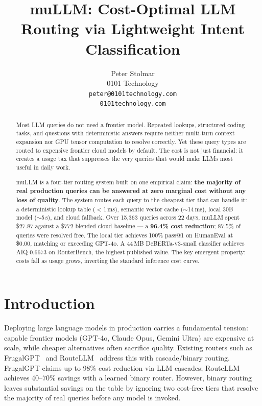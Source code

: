 \documentclass[11pt]{article}
\title{muLLM: Cost-Optimal LLM Routing via Lightweight Intent Classification}
\author{Peter Stolmar \\
  0101 Technology \\
  \texttt{peter@0101technology.com} \\
  \texttt{0101technology.com}}
\begin{document}
\maketitle

\begin{abstract}
Most LLM queries do not need a frontier model. Repeated lookups,
structured coding tasks, and questions with deterministic answers require
neither multi-turn context expansion nor GPU tensor computation to
resolve correctly. Yet these query types are routed to expensive frontier
cloud models by default. The cost is not just financial: it creates a
usage tax that suppresses the very queries that would make LLMs most
useful in daily work.

muLLM is a four-tier routing system built on one empirical claim:
\textbf{the majority of real production queries can be answered at zero
marginal cost without any loss of quality}. The system routes each query
to the cheapest tier that can handle it: a deterministic lookup table
($<$1\,ms), semantic vector cache ($\sim$14\,ms), local 30B model
($\sim$5\,s), and cloud fallback. Over 15,363 queries across 22 days,
muLLM spent \$27.87 against a \$772 blended cloud baseline --- a
\textbf{96.4\% cost reduction}; 87.5\% of queries were resolved free.
The local tier achieves 100\% pass@1 on HumanEval at \$0.00, matching
or exceeding GPT-4o. A 44\,MB DeBERTa-v3-small classifier achieves AIQ
0.6673 on RouterBench, the highest published value. The key emergent
property: costs fall as usage grows, inverting the standard inference
cost curve.
\end{abstract}

\section{Introduction}

Deploying large language models in production carries a fundamental
tension: capable frontier models (GPT-4o, Claude Opus, Gemini Ultra) are
expensive at scale, while cheaper alternatives often sacrifice quality.
Existing routers such as FrugalGPT~\cite{chen2023frugalgpt} and
RouteLLM~\cite{ong2024routellm} address this with cascade/binary
routing. FrugalGPT claims up to 98\% cost reduction via LLM cascades;
RouteLLM achieves 40--70\% savings with a learned binary router. However,
binary routing leaves substantial savings on the table by ignoring two
cost-free tiers that resolve the majority of real queries before any
model is invoked.
\end{document}
